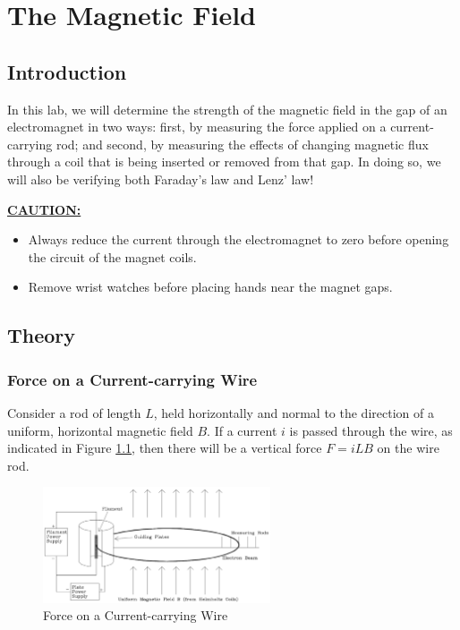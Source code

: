 \chapter{The Magnetic Field}

\section{Introduction}

In this lab, we will determine the strength of the magnetic field in the gap of an electromagnet in two ways: first, by measuring the force applied on a current-carrying rod; and second, by measuring the effects of changing magnetic flux through a coil that is being inserted or removed from that gap. In doing so, we will also be verifying both Faraday's law and Lenz' law! \myskip

\underline{\textbf{CAUTION:}}
\begin{itemize}
  \item Always reduce the current through the electromagnet to zero before opening the circuit of the magnet coils.
  \item Remove wrist watches before placing hands near the magnet gaps.
\end{itemize}

\section{Theory}
\subsection{Force on a Current-carrying Wire}
Consider a rod of length $L$, held horizontally and normal to the direction of a uniform, horizontal magnetic field $B$. If a current $i$ is passed through the wire, as indicated in Figure {\ref{fig:force}}, then there will be a vertical force $F=iLB$ on the wire rod.
\begin{figure}[h]
\centering
\includegraphics[width=0.6\textwidth]{./Exp5/pic/image1.png}
\caption{Force on a Current-carrying Wire}
\label{fig:force}
\end{figure}

